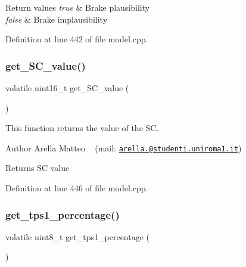 \begin{DoxyRetVals}{Return values}
{\em true} & Brake plausibility \\
\hline
{\em false} & Brake implausibility \\
\hline
\end{DoxyRetVals}


Definition at line 442 of file model.\+cpp.

\mbox{\label{group___board__model__group_ga36eddbc000c8d1820fd2a644a39c87ea}} 
\subsubsection{\texorpdfstring{get\+\_\+\+S\+C\+\_\+value()}{get\_SC\_value()}}
{\footnotesize\ttfamily volatile uint16\+\_\+t get\+\_\+\+S\+C\+\_\+value (\begin{DoxyParamCaption}{ }\end{DoxyParamCaption})}



This function returns the value of the SC. 

\begin{DoxyAuthor}{Author}
Arella Matteo ~\newline
 (mail\+: \href{mailto:arella.1646983@studenti.uniroma1.it}{\tt arella.@studenti.\+uniroma1.\+it})
\end{DoxyAuthor}
\begin{DoxyReturn}{Returns}
SC value 
\end{DoxyReturn}


Definition at line 446 of file model.\+cpp.

\mbox{\label{group___board__model__group_ga9239a95f68fab3d9b6832fbe85eb87cd}} 
\subsubsection{\texorpdfstring{get\+\_\+tps1\+\_\+percentage()}{get\_tps1\_percentage()}}
{\footnotesize\ttfamily volatile uint8\+\_\+t get\+\_\+tps1\+\_\+percentage (\begin{DoxyParamCaption}{ }\end{DoxyParamCaption})}



